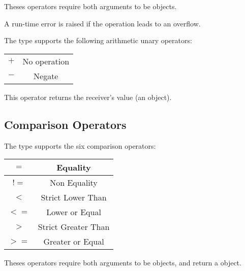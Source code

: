 Theses operators require both arguments to be  objects.\newline

A run-time error is raised if the operation leads to an overflow.

The  type supports the following arithmetic unary operators:\newline

\begin{tabular}{|c|c|}
\hline
$+$ & No operation \\
$-$ & Negate \\
\hline
\end{tabular}\newline

This operator returns the receiver's value (an  object).






\subsection{Comparison Operators}

The  type supports the six comparison operators:\newline

\begin{tabular}{|c|c|}
\hline
$=$ & Equality \\
\hline
$!=$ & Non Equality \\
\hline
$<$  & Strict Lower Than \\
\hline
$<=$  & Lower or Equal \\
\hline
$>$  & Strict Greater Than \\
\hline
$>=$  & Greater or Equal \\
\hline
\end{tabular}\newline

Theses operators require both arguments to be  objects, and return a  object.


